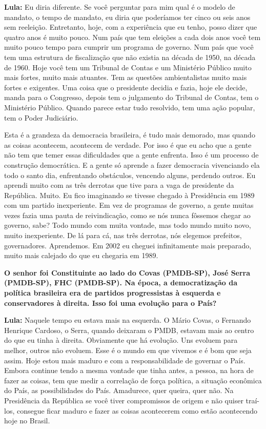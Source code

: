 \textbf{Lula:} Eu diria diferente. Se você perguntar para mim qual é o
modelo de mandato, o tempo de mandato, eu diria que poderíamos ter cinco
ou seis anos sem reeleição. Entretanto, hoje, com a experiência que eu
tenho, posso dizer que quatro anos é muito pouco. Num país que tem
eleições a cada dois anos você tem muito pouco tempo para cumprir um
programa de governo. Num país que você tem uma estrutura de fiscalização
que não existia na década de 1950, na década de 1960. Hoje você tem um
Tribunal de Contas e um Ministério Público muito mais fortes, muito mais
atuantes. Tem as questões ambientalistas muito mais fortes e exigentes.
Uma coisa que o presidente decidia e fazia, hoje ele decide, manda para
o Congresso, depois tem o julgamento do Tribunal de Contas, tem o
Ministério Público. Quando parece estar tudo resolvido, tem uma ação
popular, tem o Poder Judiciário.

Esta é a grandeza da democracia brasileira, é tudo mais demorado, mas
quando as coisas acontecem, acontecem de verdade. Por isso é que eu acho
que a gente não tem que temer essas dificuldades que a gente enfrenta.
Isso é um processo de construção democrática. E a gente só aprende a
fazer democracia vivenciando ela todo o santo dia, enfrentando
obstáculos, vencendo alguns, perdendo outros. Eu aprendi muito com as
três derrotas que tive para a vaga de presidente da República. Muito. Eu
fico imaginando se tivesse chegado à Presidência em 1989 com um partido
inexperiente. Em vez de programas de governo, a gente muitas vezes fazia
uma pauta de reivindicação, como se nós nunca fôssemos chegar ao
governo, sabe? Todo mundo com muita vontade, mas todo mundo muito novo,
muito inexperiente. De lá para cá, nas três derrotas, nós elegemos
prefeitos, governadores. Aprendemos. Em 2002 eu cheguei infinitamente
mais preparado, muito mais calejado do que eu chegaria em 1989.

\textbf{O senhor foi Constituinte ao lado do Covas (PMDB-SP), José Serra
(PMDB-SP), FHC (PMDB-SP). Na época, a democratização da política
brasileira era de partidos progressistas à esquerda e conservadores à
direita. Isso foi uma evolução para o País?}

\textbf{Lula:} Naquele tempo eu estava mais na esquerda. O Mário Covas,
o Fernando Henrique Cardoso, o Serra, quando deixaram o PMDB, estavam
mais ao centro do que eu tinha à direita. Obviamente que há evolução.
Uns evoluem para melhor, outros não evoluem. Esse é o mundo em que
vivemos e é bom que seja assim. Hoje estou mais maduro e com a
responsabilidade de governar o País. Embora continue tendo a mesma
vontade que tinha antes, a pessoa, na hora de fazer as coisas, tem que
medir a correlação de força política, a situação econômica do País, as
possibilidades do País. Amadurece, quer queira, quer não. Na Presidência
da República se você tiver compromissos de origem e não quiser traí-los,
consegue ficar maduro e fazer as coisas acontecerem como estão
acontecendo hoje no Brasil.

